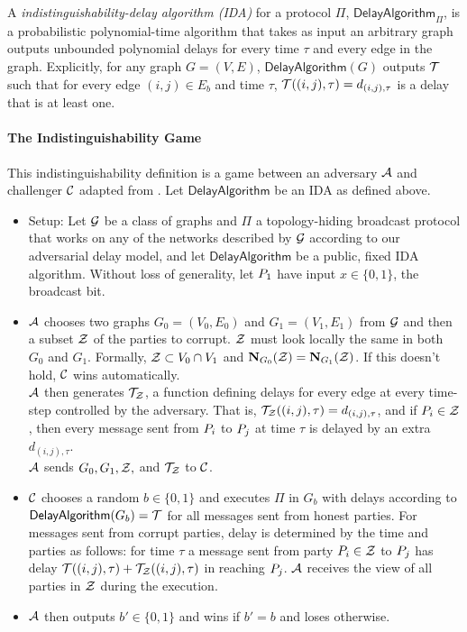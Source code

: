 \newcommand{\delayAlg}{\mathsf{DelayAlgorithm}}
\begin{definition}
	A \emph{indistinguishability-delay algorithm (IDA)} for a protocol $\Pi$, $\delayAlg_{\Pi}$, is a probabilistic polynomial-time algorithm that takes as input an arbitrary graph outputs unbounded polynomial delays for every time $\tau$ and every edge in the graph. Explicitly, for any graph $G = (V, E)$, $\delayAlg(G)$ outputs $\mathcal{T}$ such that for every edge $(i,j) \in E_b$ and time $\tau$, $\mathcal{T}((i,j), \tau) = d_{(i,j), \tau}$ is a delay that is at least one.
\end{definition}

\paragraph{The Indistinguishability Game}
This indistinguishability definition is a game between an adversary $\mathcal{A}$ and challenger $\mathcal{C}$ adapted from \cite{MOR15}. Let $\delayAlg$ be an IDA as defined above.
\begin{itemize}
	\item Setup: Let $\mathcal{G}$ be a class of graphs and $\Pi$ a topology-hiding broadcast protocol that works on any of the networks described by $\mathcal{G}$ according to our adversarial delay model, and let $\delayAlg$ be a public, fixed IDA algorithm. Without loss of generality, let $P_1$ have input $x \in \{0,1\}$, the broadcast bit.
	\item $\mathcal{A}$ chooses two graphs $G_0 = (V_0, E_0)$ and $G_1 = (V_1, E_1)$ from $\mathcal{G}$ and then a subset $\mathcal{Z}$ of the parties to corrupt. $\mathcal{Z}$ must look locally the same in both $G_0$ and $G_1$. Formally, $\mathcal{Z} \subset V_0 \cap V_1$ and $\mathbf{N}_{G_{0}}(\mathcal{Z}) = \mathbf{N}_{G_{1}}(\mathcal{Z})$. If this doesn't hold, $\mathcal{C}$ wins automatically.\\
	$\mathcal{A}$ then generates $\mathcal{T}_{\mathcal{Z}}$, a function defining delays for every edge at every time-step controlled by the adversary. That is, $\mathcal{T}_{\mathcal{Z}}((i,j), \tau) = d_{(i,j),\tau}$, and if $P_i \in \mathcal{Z}$, then every message sent from $P_i$ to $P_j$ at time $\tau$ is delayed by an extra $d_{(i,j), \tau}$.\\
	$\mathcal{A}$ sends $G_0, G_1, \mathcal{Z},$ and $\mathcal{T}_{\mathcal{Z}}$ to $\mathcal{C}$.
	
	\item $\mathcal{C}$ chooses a random $b \in \{0,1\}$ and executes $\Pi$ in $G_b$ with delays according to $\delayAlg(G_b) = \cT$ for all messages sent from honest parties. For messages sent from corrupt parties, delay is determined by the time and parties as follows: for time $\tau$ a message sent from party $P_i \in \mathcal{Z}$ to $P_j$ has delay $\mathcal{T}((i,j), \tau) + \mathcal{T}_{\mathcal{Z}}((i,j), \tau)$ in reaching $P_j$. $\mathcal{A}$ receives the view of all parties in $\mathcal{Z}$ during the execution.
	
	\item $\mathcal{A}$ then outputs $b' \in \{0,1\}$ and wins if $b' = b$ and loses otherwise.
\end{itemize}

